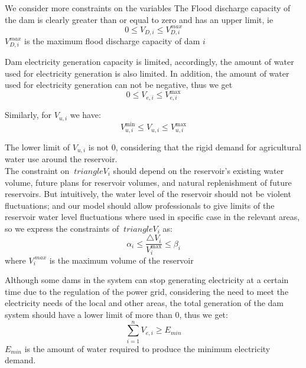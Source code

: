 \documentclass{mcmthesis}
\begin{document}
We consider more constraints on the variables
The Flood discharge capacity of the dam is clearly greater than or equal to zero and has an upper limit, ie
\begin{equation}
0 \leq V_{D, i} \leq V_{D, i}^{max}
\end{equation}
$ V_{D, i} ^ {max} $ is the maximum flood discharge capacity of dam $i$

Dam electricity generation capacity is limited, accordingly, the amount of water used for electricity generation is also limited. In addition, the amount of water used for electricity generation can not be negative, thus we get
\begin{equation}
0 \leq V_{e, i} \leq V_{e, i}^{\max}
\end{equation}

Similarly, for $ V_ {u, i} $ we have:
\begin{equation}
V_{u, i}^{\min} \leq V_{u, i} \leq V_{u, i}^{\max}
\end{equation}

\indent The lower limit of $ V_ {u, i} $ is not $ 0 $, considering that the rigid demand for agricultural water use around the reservoir.\\
\indent The constraint on $ \ triangle V_ {i} $ should depend on the reservoir's existing water volume, future plans for reservoir volumes, and natural replenishment of future reservoirs. But intuitively, the water level of the reservoir should not be violent fluctuations; and our model should allow professionals to give limits of the reservoir water level fluctuations where used in specific case in the relevant areas, so we express the constraints of $ \ triangle V_ {i} $ as:
\begin{equation}
\alpha_{i} \leq \frac{\triangle V_{i}}{V_{i}^{\max}} \leq \beta_{i}
\end{equation}
where $ V_ {i} ^ {\ max} $ is the maximum volume of the reservoir

\indent Although some dams in the system can stop generating electricity at a certain time due to the regulation of the power grid, considering the need to meet the electricity needs of the local and other areas, the total generation of the dam system should have a lower limit of more than $ 0 $, thus we get:
\begin{equation}
\sum_{i = 1}^{n} V_{e, i} \geq E_{min}
\end{equation}
$ E_ {min} $ is the amount of water required to produce the minimum electricity demand.
\end{document}
